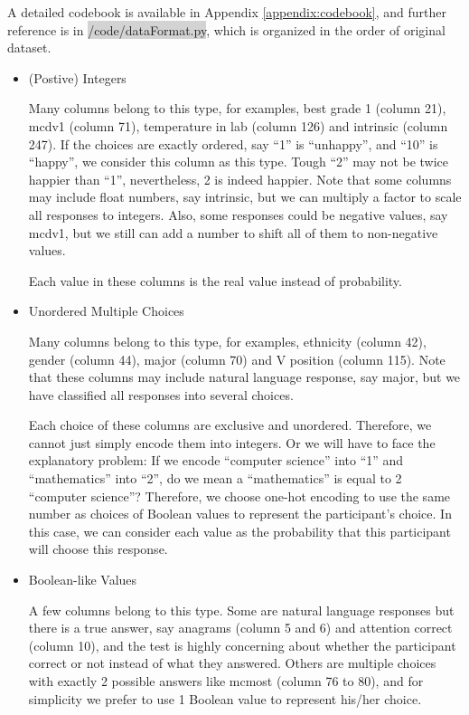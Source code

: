\documentclass[11pt, a4paper]{article}
\begin{document}
\begin{enumerate}
\begin{itemize}
{			A detailed codebook is available in Appendix \ref{appendix:codebook}, and further reference is in \colorbox{lightgray}{/code/dataFormat.py}, which is organized in the order of original dataset.}
		\begin{itemize}
			\item {(Postive) Integers}
			\par{Many columns belong to this type, for examples, best grade 1 (column 21), mcdv1 (column 71), temperature in lab (column 126) and intrinsic (column 247). If the choices are exactly ordered, say ``1'' is ``unhappy'', and ``10'' is ``happy'', we consider this column as this type. Tough ``2'' may not be twice happier than ``1'', nevertheless, 2 is indeed happier. Note that some columns may include float numbers, say intrinsic, but we can multiply a factor to scale all responses to integers. Also, some responses could be negative values, say mcdv1, but we still can add a number to shift all of them to non-negative values.}
			\par{Each value in these columns is the real value instead of probability.}
			\item {Unordered Multiple Choices}
			\par{Many columns belong to this type, for examples, ethnicity (column 42), gender (column 44), major (column 70) and V position (column 115). Note that these columns may include natural language response, say major, but we have classified all responses into several choices.}
			\par{Each choice of these columns are exclusive and unordered. Therefore, we cannot just simply encode them into integers. Or we will have to face the explanatory problem: If we encode ``computer science'' into ``1'' and ``mathematics'' into ``2'', do we mean a ``mathematics'' is equal to 2 ``computer science''? Therefore, we choose one-hot encoding to use the same number as choices of Boolean values to represent the participant’s choice. In this case, we can consider each value as the probability that this participant will choose this response. }
			\item {Boolean-like Values}
			\par{A few columns belong to this type. Some are natural language responses but there is a true answer, say anagrams (column 5 and 6) and attention correct (column 10), and the test is highly concerning about whether the participant correct or not instead of what they answered. Others are multiple choices with exactly 2 possible answers like mcmost (column 76 to 80), and for simplicity we prefer to use 1 Boolean value to represent his/her choice.}

\end{itemize}
\end{itemize}
\end{enumerate}
\end{document}
